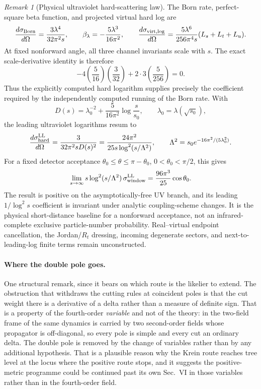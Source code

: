 \documentclass[11pt]{article}
\theoremstyle{definition}
\theoremstyle{remark}
\newtheorem{remark}[theorem]{Remark}
\begin{document}
\begin{remark}[Physical ultraviolet hard-scattering law]
\label{rem:btuvhard}
The Born rate, perfect-square beta function, and projected virtual hard log are
\[
 \frac{d\sigma_{\rm Born}}{d\Omega}
 =\frac{3\lambda^4}{32\pi^2s},\qquad
 \beta_\lambda=-\frac{5\lambda^3}{16\pi^2},\qquad
 \frac{d\sigma_{\rm virt,log}}{d\Omega}
 =\frac{5\lambda^6}{256\pi^4s}(L_s+L_t+L_u).
\]
At fixed nonforward angle, all three channel invariants scale with $s$.
The exact scale-derivative identity is therefore
\[
 -4\left(\frac5{16}\right)\left(\frac3{32}\right)
 +2\cdot3\left(\frac5{256}\right)=0.
\]
Thus the explicitly computed hard logarithm supplies precisely the coefficient
required by the independently computed running of the Born rate.  With
\[
 D(s)=\lambda_0^{-2}+\frac5{16\pi^2}\log\frac{s}{s_0},
 \qquad \lambda_0=\lambda(\sqrt{s_0}),
\]
the leading ultraviolet logarithms resum to
\[
 \frac{d\sigma_{\rm hard}^{\rm LL}}{d\Omega}
 =\frac{3}{32\pi^2sD(s)^2}
 =\frac{24\pi^2}{25s\log^2(s/\Lambda^2)},
 \qquad
 \Lambda^2=s_0e^{-16\pi^2/(5\lambda_0^2)}.
\]
For a fixed detector acceptance
$\theta_0\leq\theta\leq\pi-\theta_0$, $0<\theta_0<\pi/2$, this gives
\[
 \lim_{s\to\infty}s\log^2(s/\Lambda^2)\,
 \sigma_{\rm window}^{\rm LL}
 =\frac{96\pi^3}{25}\cos\theta_0.
\]
The result is positive on the asymptotically-free UV branch, and its leading
$1/\log^2s$ coefficient is invariant under analytic coupling-scheme changes.
It is the physical short-distance baseline for a nonforward acceptance, not an
infrared-complete exclusive particle-number probability.  Real--virtual
endpoint cancellation, the Jordan/$R_t$ dressing, incoming degenerate sectors,
and next-to-leading-log finite terms remain unconstructed.
\end{remark}

\paragraph{Where the double pole goes.}
One structural remark, since it bears on which route is the likelier to extend.
The obstruction that withdraws the cutting rules at coincident poles is that
the cut weight there is a derivative of a delta rather than a measure of
definite sign.  That is a property of the fourth-order \emph{variable} and not
of the theory: in the two-field frame of \cite{BT2026} the same dynamics is
carried by two second-order fields whose propagator is off-diagonal, so every
pole is simple and every cut an ordinary delta.  The double pole is removed by
the change of variables rather than by any additional hypothesis.  That is a
plausible reason why the Krein route reaches tree level at the locus where the
positive route stops, and it suggests the positive-metric programme could be
continued past its own Sec.~VI in those variables rather than in the
fourth-order field.
\end{document}
